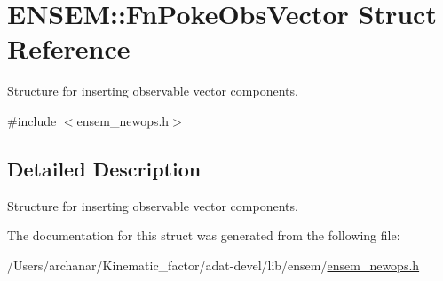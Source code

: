 \hypertarget{structENSEM_1_1FnPokeObsVector}{}\section{E\+N\+S\+EM\+:\+:Fn\+Poke\+Obs\+Vector Struct Reference}
\label{structENSEM_1_1FnPokeObsVector}


Structure for inserting observable vector components.  




{\ttfamily \#include $<$ensem\+\_\+newops.\+h$>$}



\subsection{Detailed Description}
Structure for inserting observable vector components. 

The documentation for this struct was generated from the following file\+:\begin{DoxyCompactItemize}
\item 
/\+Users/archanar/\+Kinematic\+\_\+factor/adat-\/devel/lib/ensem/\mbox{\hyperlink{adat-devel_2lib_2ensem_2ensem__newops_8h}{ensem\+\_\+newops.\+h}}\end{DoxyCompactItemize}
